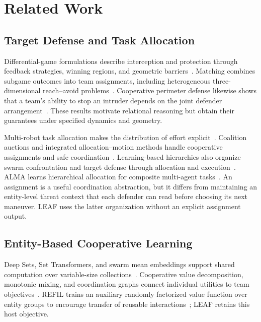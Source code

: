 ﻿\section{Related Work}
\subsection{Target Defense and Task Allocation}
Differential-game formulations describe interception and protection through feedback strategies, winning regions, and geometric barriers~\cite{garcia2019activedefense,chen2017reachavoid,yan2020barriers}. Matching combines subgame outcomes into team assignments, including heterogeneous three-dimensional reach--avoid problems~\cite{yan2022matching}. Cooperative perimeter defense likewise shows that a team's ability to stop an intruder depends on the joint defender arrangement~\cite{shishika2020perimeter}. These results motivate relational reasoning but obtain their guarantees under specified dynamics and geometry.

Multi-robot task allocation makes the distribution of effort explicit~\cite{gerkey2004allocation,choi2009auction}. Coalition auctions and integrated allocation--motion methods handle cooperative assignments and safe coordination~\cite{deng2024coalitions,miele2025coordination}. Learning-based hierarchies also organize swarm confrontation and target defense through allocation and execution~\cite{wu2025swarm,li2025targetdefense}. ALMA learns hierarchical allocation for composite multi-agent tasks~\cite{iqbal2022alma}. An assignment is a useful coordination abstraction, but it differs from maintaining an entity-level threat context that each defender can read before choosing its next maneuver. LEAF uses the latter organization without an explicit assignment output.

\subsection{Entity-Based Cooperative Learning}
Deep Sets, Set Transformers, and swarm mean embeddings support shared computation over variable-size collections~\cite{zaheer2017deepsets,lee2019settransformer,huttenrauch2019swarm}. Cooperative value decomposition, monotonic mixing, and coordination graphs connect individual utilities to team objectives~\cite{sunehag2018vdn,rashid2018qmix,boehmer2020dcg}. REFIL trains an auxiliary randomly factorized value function over entity groups to encourage transfer of reusable interactions~\cite{iqbal2021refil}; LEAF retains this host objective.

